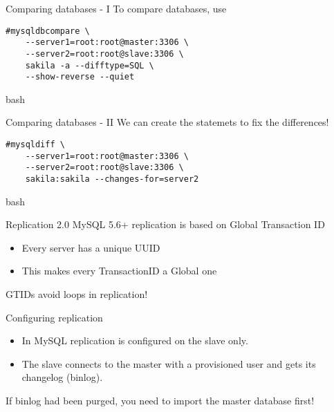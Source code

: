 \documentclass{beamer}[10]
\begin{document}
%
%
\begin{pyframe}{Comparing databases - I}
To compare databases, use
\begin{verbatim}
#mysqldbcompare \
    --server1=root:root@master:3306 \
    --server2=root:root@slave:3306 \
    sakila -a --difftype=SQL \
    --show-reverse --quiet
\end{verbatim}{bash}
\end{pyframe}


\begin{pyframe}{Comparing databases - II}
We can create the statemets to fix the differences!
\begin{verbatim}
#mysqldiff \
    --server1=root:root@master:3306 \
    --server2=root:root@slave:3306 \
    sakila:sakila --changes-for=server2
\end{verbatim}{bash}
\end{pyframe}


%
%
\begin{pyframe}{Replication 2.0}
MySQL 5.6+ replication is based on Global Transaction ID
\begin{itemize}
\item Every server has a unique UUID \\

\item This makes every TransactionID a Global one
\end{itemize}
GTIDs avoid loops in replication!
\end{pyframe}


\begin{pyframe}{Configuring replication}
\begin{itemize}
\item In MySQL replication is configured on the slave only.
\item The slave connects to the master with a provisioned
 user and gets its changelog (binlog).
\end{itemize}
If binlog had been purged, you need to import the
master database first!
\end{pyframe}


\end{document}
